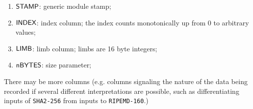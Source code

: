 \begin{enumerate}
\item $\textsf{STAMP}$: generic module stamp;
\item $\textsf{INDEX}$: index column; the index counts monotonically up from $0$ to arbitrary values;
\item $\textsf{LIMB}$: limb column; limbs are 16 byte integers;
\item $\textsf{nBYTES}$: size parameter;
\end{enumerate}
There may be more columns (e.g. columns signaling the nature of the data being recorded if several different interpretations are possible, such as differentiating inputs of \texttt{SHA2-256} from inputs to \texttt{RIPEMD-160}.)

